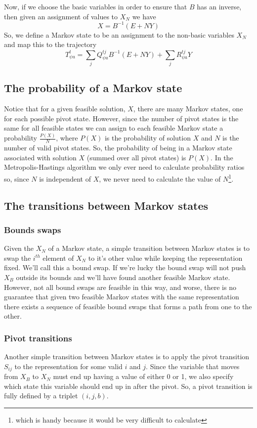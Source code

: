 \documentclass{article}
\begin{document}
Now, if we choose the basic variables in order to ensure that $B$ has an inverse, then given an assignment of values to $X_N$ we have 
\[
X = B^{-1}(E+ NY)
\]
So, we define a Markov state to be an assignment to the non-basic variables $X_N$ and map this to the trajectory
\[
T^t_{\psi a} =  \sum_{j}Q_{\psi a}^{tj}B^{-1}(E+ NY) + \sum_{j}R_{\psi a}^{t j} Y
\]


\subsection{The probability of a Markov state}

Notice that for a given feasible solution, $X$, there are many Markov states, one for each possible pivot state. However, since the number of pivot states is the same for all feasible states we can assign to each feasible Markov state a probability $\frac{P(X)}{N}$, where $P(X)$ is the probability of solution $X$ and $N$ is the number of valid pivot states. So, the probability of being in a Markov state associated with solution $X$ (summed over all pivot states) is $P(X)$. In the Metropolis-Hastings algorithm we only ever need to calculate probability ratios so, since $N$ is independent of $X$, we never need to calculate the value of $N$\footnote{which is handy because it would be very difficult to calculate}.

\subsection{The transitions between Markov states}

\subsubsection{Bounds swaps}
Given the $X_N$ of a Markov state, a simple transition between Markov states is to swap the $i^{th}$ element of $X_N$ to it's other value while keeping the representation fixed. We'll call this a bound swap. If we're lucky the bound swap will not push $X_B$ outside its bounds and we'll have found another feasible Markov state. However, not all bound swaps are feasible in this way, and worse, there is no guarantee that given two feasible Markov states with the same representation there exists a sequence of feasible bound swaps that forms a path from one to the other.

\subsubsection{Pivot transitions}
Another simple transition between Markov states is to apply the pivot transition $S_{ij}$ to the representation for some valid $i$ and $j$. Since the variable that moves from $X_B$ to $X_N$ must end up having a value of either 0 or 1, we also specify which state this variable should end up in after the pivot. So, a pivot transition is fully defined by a triplet $(i,j,b)$.
\end{document}
